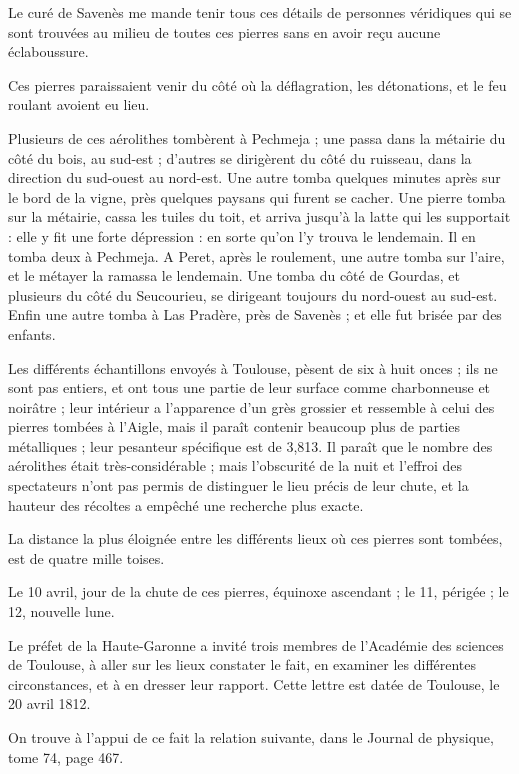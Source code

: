 \documentclass[a4paper, 12pt, oneside, french]{article}
\begin{document}
\og Le curé de Savenès me mande tenir tous ces détails de personnes véridiques qui se sont trouvées au milieu de toutes ces pierres sans en avoir reçu aucune éclaboussure. \fg

\og Ces pierres paraissaient venir du côté où la déflagration, les détonations, et le feu roulant avoient eu lieu. \fg

\og Plusieurs de ces aérolithes tombèrent à Pechmeja ; une passa dans la métairie du côté du bois, au sud-est ; d'autres se dirigèrent du côté du ruisseau, dans la direction du sud-ouest au nord-est. Une autre tomba quelques minutes après sur le bord de la vigne, près quelques paysans qui furent se cacher. Une pierre tomba sur la métairie, cassa les tuiles du toit, et arriva jusqu'à la latte qui les supportait : elle y fit une forte dépression : en sorte qu'on l'y trouva le lendemain. Il en tomba deux à Pechmeja. A Peret, après le roulement, une autre tomba sur l'aire, et le métayer la ramassa le lendemain. Une tomba du côté de Gourdas, et plusieurs du côté du Seucourieu, se dirigeant toujours du nord-ouest au sud-est. Enfin une autre tomba à Las Pradère, près de Savenès ; et elle fut brisée par des enfants. \fg

\og Les différents échantillons envoyés à Toulouse, pèsent de six à huit onces ; ils ne sont pas entiers, et ont tous une partie de leur surface comme charbonneuse et noirâtre ; leur intérieur a l'apparence d'un grès grossier et ressemble à celui des pierres tombées à l'Aigle, mais il paraît contenir beaucoup plus de parties métalliques ; leur pesanteur spécifique est de 3,813. Il paraît que le nombre des aérolithes était très-considérable ; mais l'obscurité de la nuit et l'effroi des spectateurs n'ont pas permis de distinguer le lieu précis de leur chute, et la hauteur des récoltes a empêché une recherche plus exacte. \fg

\og La distance la plus éloignée entre les différents lieux où ces pierres sont tombées, est de quatre mille toises. \fg

\og Le 10 avril, jour de la chute de ces pierres, équinoxe ascendant ; le 11, périgée ; le 12, nouvelle lune. \fg

\og Le préfet de la Haute-Garonne a invité trois membres de l'Académie des sciences de Toulouse, à aller sur les lieux constater le fait, en examiner les différentes circonstances, et à en dresser leur rapport. \fg Cette lettre est datée de Toulouse, le 20 avril 1812.

On trouve à l'appui de ce fait la relation suivante, dans le Journal de physique, tome 74, page 467.
\end{document}
